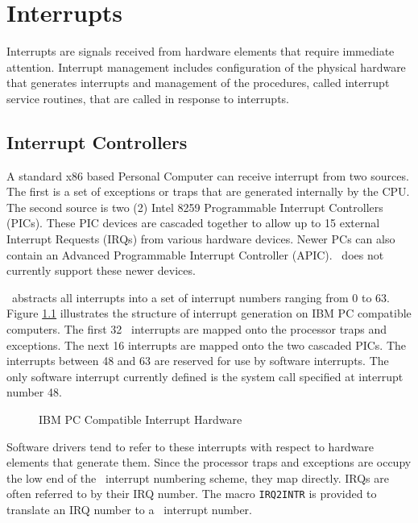 \chapter{Interrupts}

Interrupts are signals received from hardware elements that
require immediate attention.  Interrupt management includes
configuration of the physical hardware that generates interrupts
and management of the procedures, called interrupt service
routines, that are called in response to interrupts.


\section{Interrupt Controllers}

A standard x86 based Personal Computer can receive interrupt
from two sources.  The first is a set of exceptions or traps
that are generated internally by the CPU.  The second source
is two (2) Intel 8259 Programmable Interrupt Controllers (PICs).
These PIC devices are cascaded together to allow up to 15
external Interrupt Requests (IRQs) from various hardware devices.
Newer PCs can also contain an Advanced Programmable Interrupt
Controller (APIC).  \roadrunner\  does not currently support
these newer devices.

\roadrunner\  abstracts all interrupts into a set of interrupt
numbers ranging from 0 to 63.  Figure \ref{irq} illustrates
the structure of interrupt generation on IBM PC compatible
computers.  The first 32 \roadrunner\ interrupts are mapped
onto the processor traps and exceptions.  The next 16
interrupts are mapped onto the two cascaded PICs.  The
interrupts between 48 and 63 are reserved for use by software
interrupts.  The only software interrupt currently defined is
the system call specified at interrupt number 48.

\begin{center}\begin{figure}[h]
\centerline{}
\caption{\label{irq} IBM PC Compatible Interrupt Hardware}
\end{figure}\end{center}

Software drivers tend to refer to these interrupts with
respect to hardware elements that generate them.  Since the
processor traps and exceptions are occupy the low end of the
\roadrunner\  interrupt numbering scheme, they map directly.
IRQs are often referred to by their IRQ number.  The macro 
{\tt IRQ2INTR} is provided to translate an IRQ number to
a \roadrunner\  interrupt number.

